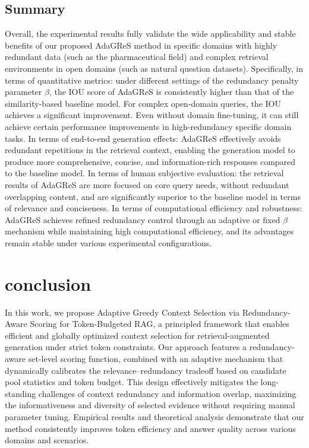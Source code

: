 \documentclass[11pt]{article}
\begin{document}
\subsection{Summary}
Overall, the experimental results fully validate the wide applicability and stable benefits of our proposed AdaGReS method in specific domains with highly redundant data (such as the pharmaceutical field) and complex retrieval environments in open domains (such as natural question datasets). Specifically, in terms of quantitative metrics: under different settings of the redundancy penalty parameter $\beta$, the IOU score of AdaGReS is consistently higher than that of the similarity-based baseline model. For complex open-domain queries, the IOU achieves a significant improvement. Even without domain fine-tuning, it can still achieve certain performance improvements in high-redundancy specific domain tasks. In terms of end-to-end generation effects: AdaGReS effectively avoids redundant repetitions in the retrieval context, enabling the generation model to produce more comprehensive, concise, and information-rich responses compared to the baseline model. In terms of human subjective evaluation: the retrieval results of AdaGReS are more focused on core query needs, without redundant overlapping content, and are significantly superior to the baseline model in terms of relevance and conciseness. In terms of computational efficiency and robustness: AdaGReS achieves refined redundancy control through an adaptive or fixed $\beta$ mechanism while maintaining high computational efficiency, and its advantages remain stable under various experimental configurations.


\section{conclusion}
In this work, we propose Adaptive Greedy Context Selection via Redundancy-Aware Scoring for Token-Budgeted RAG, a principled framework that enables efficient and globally optimized context selection for retrieval-augmented generation under strict token constraints. Our approach features a redundancy-aware set-level scoring function, combined with an adaptive mechanism that dynamically calibrates the relevance–redundancy tradeoff based on candidate pool statistics and token budget. This design effectively mitigates the long-standing challenges of context redundancy and information overlap, maximizing the informativeness and diversity of selected evidence without requiring manual parameter tuning. Empirical results and theoretical analysis demonstrate that our method consistently improves token efficiency and answer quality across various domains and scenarios.
\end{document}
